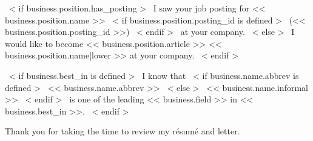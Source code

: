 ~< if business.position.has_posting >~
    I saw your job posting for << business.position.name >>
    ~< if business.position.posting_id is defined >~ (<< business.position.posting_id >>) ~< endif >~ at your company.
~< else >~
    I would like to become << business.position.article >> << business.position.name|lower >> at your company.
~< endif >~

~< if business.best_in is defined >~
    I know that
    ~< if business.name.abbrev is defined >~
        << business.name.abbrev >>
    ~< else >~
        << business.name.informal >>
    ~< endif >~
    is one of the leading << business.field >> in << business.best_in >>.
~< endif >~

Thank you for taking the time to review my résumé and letter.

